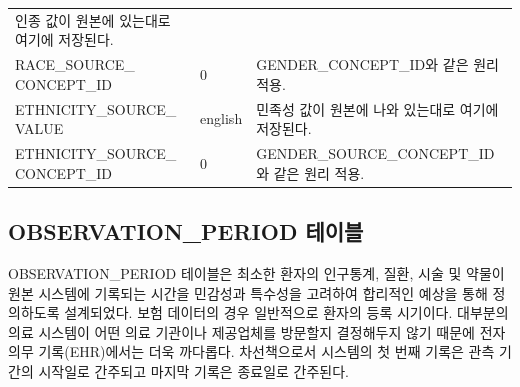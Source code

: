 \documentclass[11pt]{book}
\theoremstyle{definition}
\theoremstyle{definition}
\theoremstyle{definition}
\theoremstyle{remark}
\begin{document}
\begin{longtable}[]{@{}lll@{}}
\begin{minipage}[t]{0.48\columnwidth}
인종 값이 원본에 있는대로 여기에 저장된다.\strut
\end{minipage}\tabularnewline
\begin{minipage}[t]{0.28\columnwidth}\raggedright\strut
RACE\_SOURCE\_ CONCEPT\_ID\strut
\end{minipage} & \begin{minipage}[t]{0.16\columnwidth}\raggedright\strut
0\strut
\end{minipage} & \begin{minipage}[t]{0.48\columnwidth}\raggedright\strut
GENDER\_CONCEPT\_ID와 같은 원리 적용.\strut
\end{minipage}\tabularnewline
\begin{minipage}[t]{0.28\columnwidth}\raggedright\strut
ETHNICITY\_SOURCE\_ VALUE\strut
\end{minipage} & \begin{minipage}[t]{0.16\columnwidth}\raggedright\strut
english\strut
\end{minipage} & \begin{minipage}[t]{0.48\columnwidth}\raggedright\strut
민족성 값이 원본에 나와 있는대로 여기에 저장된다.\strut
\end{minipage}\tabularnewline
\begin{minipage}[t]{0.28\columnwidth}\raggedright\strut
ETHNICITY\_SOURCE\_ CONCEPT\_ID\strut
\end{minipage} & \begin{minipage}[t]{0.16\columnwidth}\raggedright\strut
0\strut
\end{minipage} & \begin{minipage}[t]{0.48\columnwidth}\raggedright\strut
GENDER\_SOURCE\_CONCEPT\_ID와 같은 원리 적용.\strut
\end{minipage}\tabularnewline
\bottomrule
\end{longtable}

\subsection{OBSERVATION\_PERIOD 테이블}\label{observationPeriod}

OBSERVATION\_PERIOD 테이블은 최소한 환자의 인구통계, 질환, 시술 및
약물이 원본 시스템에 기록되는 시간을 민감성과 특수성을 고려하여 합리적인
예상을 통해 정의하도록 설계되었다. 보험 데이터의 경우 일반적으로 환자의
등록 시기이다. 대부분의 의료 시스템이 어떤 의료 기관이나 제공업체를
방문할지 결정해두지 않기 때문에 전자 의무 기록(EHR)에서는 더욱 까다롭다.
차선책으로서 시스템의 첫 번째 기록은 관측 기간의 시작일로 간주되고
마지막 기록은 종료일로 간주된다.
\end{document}
